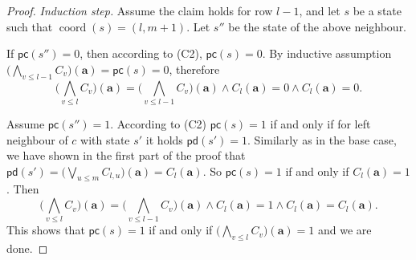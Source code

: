 \documentclass[10pt,a4paper]{amsart}
\DeclareMathOperator{\coord}{coord}
\newcommand{\tuple}{\mathbf}
\begin{document}
\begin{proof}
\emph{Induction step.}
Assume the claim holds for row $l-1$, and let $s$ be a state such that
$\coord(s)=(l,m+1)$. Let $s''$ be the state of the above neighbour.

If $\mathsf{pc}(s'')=0$, then according to (C2), $\mathsf{pc}(s)=0$. By inductive assumption $\bigl(\bigwedge_{v \leq l-1}C_v\bigr) (\tuple a) =\mathsf{pc}(s)=0$, therefore
\[
\bigl(\bigwedge_{v \leq l}C_v\bigr) (\tuple a) = \bigl(\bigwedge_{v \leq l-1}C_v\bigr) (\tuple a) \wedge C_{l}(\tuple a) = 0 \wedge C_{l}(\tuple a) =0.
\]

Assume $\mathsf{pc}(s'')=1$. According to (C2) $\mathsf{pc}(s)=1$ if and only if for left neighbour of $c$ with state $s'$ it holds $\mathsf{pd}(s')=1$. Similarly as in the base case, we have shown in the first part of the proof that $\mathsf{pd}(s') = (\bigvee_{u \leq m} C_{l,u}\bigr)(\tuple a) = C_{l}(\tuple a)$. So $\mathsf{pc}(s)=1$ if and only if $C_{l}(\tuple a) =1$. Then 
\[
\bigl(\bigwedge_{v \leq l}C_v\bigr) (\tuple a) = \bigl(\bigwedge_{v \leq l-1}C_v\bigr) (\tuple a) \wedge C_{l}(\tuple a) = 1 \wedge  C_{l}(\tuple a) = C_{l}(\tuple a).
\]
This shows that $\mathsf{pc}(s)=1$ if and only if $\bigl(\bigwedge_{v \leq l}C_v\bigr) (\tuple a) =1$ and we are done.
\end{proof}
\end{document}

